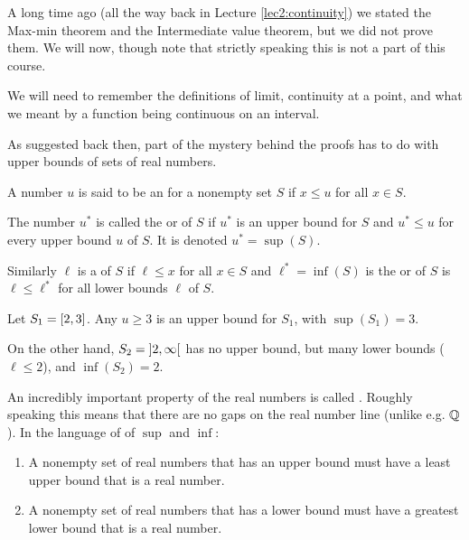

A long time ago (all the way back in Lecture \ref{lec2:continuity}) we stated the Max-min theorem and the Intermediate value theorem, but we did not prove them.
We will now, though note that strictly speaking this is not a part of this course.

We will need to remember the definitions of limit, continuity at a point, and what we meant by a function being continuous on an interval.

As suggested back then, part of the mystery behind the proofs has to do with upper bounds of sets of real numbers.

\begin{definition}
	A number $u$ is said to be an  for a nonempty set $S$ if $x \leq u$ for all $x \in S$.

	The number $u^*$ is called the  or  of $S$ if $u^*$ is an upper bound for $S$ and $u^* \leq u$ for every upper bound $u$ of $S$.
	It is denoted $u^* = \sup(S)$.

	Similarly $\ell$ is a  of $S$ if $\ell \leq x$ for all $x \in S$ and $\ell^* = \inf(S)$ is the  or  of $S$ is $\ell \leq \ell^*$ for all lower bounds $\ell$ of $S$.
\end{definition}

\begin{example}
	Let $S_1 = \interval{2}{3}$. Any $u \geq 3$ is an upper bound for $S_1$, with $\sup(S_1) = 3$.

	On the other hand, $S_2 = \interval[open]{2}{\infty}$ has no upper bound, but many lower bounds ($\ell \leq 2$), and $\inf(S_2) = 2$.
\end{example}

\noindent
An incredibly important property of the real numbers is called .
Roughly speaking this means that there are no gaps on the real number line (unlike e.g. $\mathbb{Q}$).
In the language of of $\sup$ and $\inf$:
\begin{enumerate}
	\item A nonempty set of real numbers that has an upper bound must have a least upper bound that is a real number.
	\item A nonempty set of real numbers that has a lower bound must have a greatest lower bound that is a real number.
\end{enumerate}

